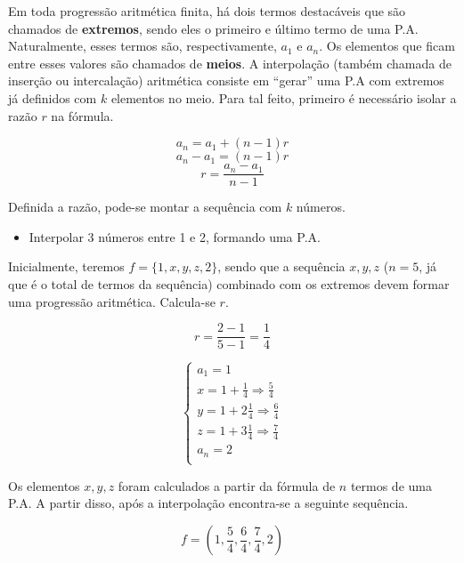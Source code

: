 Em toda progressão aritmética finita, há dois termos destacáveis que são chamados de \textbf{extremos}, sendo eles o primeiro e último termo de uma P.A. Naturalmente, esses termos são, respectivamente, $a_{1}$ e $a_{n}$. Os elementos que ficam entre esses valores são chamados de \textbf{meios}. A interpolação (também chamada de inserção ou intercalação) aritmética consiste em ``gerar'' uma P.A com extremos já definidos com $k$ elementos no meio. Para tal feito, primeiro é necessário isolar a razão $r$ na fórmula.


\begin{tcolorbox}[colback=LightGreen]
\[a_{n} = a_{1} + (n - 1)r\]
\[a_{n} - a_{1} = (n - 1)r\]
\[r = \frac{a_{n} - a_{1}}{n - 1}\]
\end{tcolorbox}

Definida a razão, pode-se montar a sequência com $k$ números.

\begin{tcolorbox}[colback=LightYellow]
\begin{itemize}
        \item Interpolar 3 números entre 1 e 2, formando uma P.A.
\end{itemize}
\end{tcolorbox}

\begin{tcolorbox}[colback=LightYellow]
Inicialmente, teremos $f = \{1, x, y, z, 2\}$, sendo que a sequência $x, y, z$ ($n = 5$, já que é o total de termos da sequência) combinado com os extremos devem formar uma progressão aritmética. Calcula-se $r$.

\[r = \frac{2 - 1}{5 - 1} = \frac{1}{4}\]

\end{tcolorbox}

\begin{tcolorbox}[colback=LightYellow]
\begin{equation*}
  \begin{cases}
    a_{1} = 1 \\
    x = 1 + \frac{1}{4} \Rightarrow \frac{5}{4} \\
    y = 1 + 2\frac{1}{4} \Rightarrow \frac{6}{4} \\
    z = 1 + 3\frac{1}{4} \Rightarrow \frac{7}{4} \\
    a_{n} = 2 \\
  \end{cases}
\end{equation*}

Os elementos $x, y, z$ foram calculados a partir da fórmula de $n$ termos de uma P.A. A partir disso, após a interpolação encontra-se a seguinte sequência.

\[f = \left(1, \frac{5}{4}, \frac{6}{4}, \frac{7}{4}, 2\right)\]
\end{tcolorbox}

